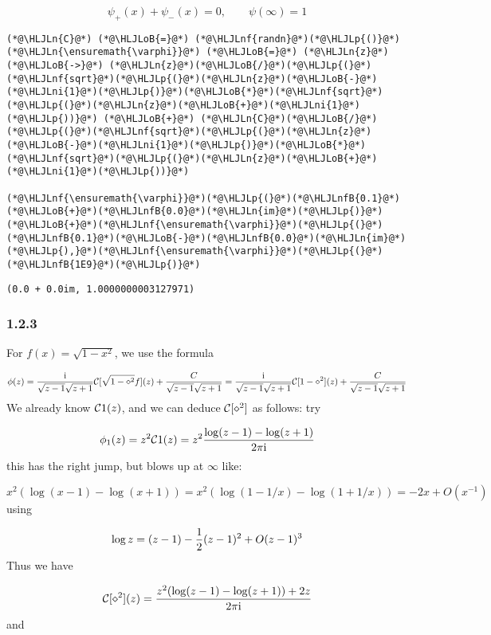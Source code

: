 \documentclass[12pt,a4paper]{article}
\newcommand{\HLJLn}[1]{#1}
\newcommand{\HLJLnf}[1]{\textcolor[RGB]{66,102,213}{#1}}
\newcommand{\HLJLnfB}[1]{\textcolor[RGB]{59,151,46}{#1}}
\newcommand{\HLJLni}[1]{\textcolor[RGB]{59,151,46}{#1}}
\newcommand{\HLJLoB}[1]{\textcolor[RGB]{102,102,102}{\textbf{#1}}}
\newcommand{\HLJLp}[1]{#1}
\def\I{ {\rm i} }
\def\CC{ {\cal C} }
\begin{document}
\[
\psi_+(x) + \psi_-(x) = 0, \qquad \psi(\infty) = 1
\]

\begin{lstlisting}
(*@\HLJLn{C}@*) (*@\HLJLoB{=}@*) (*@\HLJLnf{randn}@*)(*@\HLJLp{()}@*)
(*@\HLJLn{\ensuremath{\varphi}}@*) (*@\HLJLoB{=}@*) (*@\HLJLn{z}@*) (*@\HLJLoB{->}@*) (*@\HLJLn{z}@*)(*@\HLJLoB{/}@*)(*@\HLJLp{(}@*)(*@\HLJLnf{sqrt}@*)(*@\HLJLp{(}@*)(*@\HLJLn{z}@*)(*@\HLJLoB{-}@*)(*@\HLJLni{1}@*)(*@\HLJLp{)}@*)(*@\HLJLoB{*}@*)(*@\HLJLnf{sqrt}@*)(*@\HLJLp{(}@*)(*@\HLJLn{z}@*)(*@\HLJLoB{+}@*)(*@\HLJLni{1}@*)(*@\HLJLp{))}@*) (*@\HLJLoB{+}@*) (*@\HLJLn{C}@*)(*@\HLJLoB{/}@*)(*@\HLJLp{(}@*)(*@\HLJLnf{sqrt}@*)(*@\HLJLp{(}@*)(*@\HLJLn{z}@*)(*@\HLJLoB{-}@*)(*@\HLJLni{1}@*)(*@\HLJLp{)}@*)(*@\HLJLoB{*}@*)(*@\HLJLnf{sqrt}@*)(*@\HLJLp{(}@*)(*@\HLJLn{z}@*)(*@\HLJLoB{+}@*)(*@\HLJLni{1}@*)(*@\HLJLp{))}@*)

(*@\HLJLnf{\ensuremath{\varphi}}@*)(*@\HLJLp{(}@*)(*@\HLJLnfB{0.1}@*)(*@\HLJLoB{+}@*)(*@\HLJLnfB{0.0}@*)(*@\HLJLn{im}@*)(*@\HLJLp{)}@*)(*@\HLJLoB{+}@*)(*@\HLJLnf{\ensuremath{\varphi}}@*)(*@\HLJLp{(}@*)(*@\HLJLnfB{0.1}@*)(*@\HLJLoB{-}@*)(*@\HLJLnfB{0.0}@*)(*@\HLJLn{im}@*)(*@\HLJLp{),}@*)(*@\HLJLnf{\ensuremath{\varphi}}@*)(*@\HLJLp{(}@*)(*@\HLJLnfB{1E9}@*)(*@\HLJLp{)}@*)
\end{lstlisting}

\begin{lstlisting}
(0.0 + 0.0im, 1.0000000003127971)
\end{lstlisting}


\subsubsection{1.2.3}
For $f(x) = \sqrt{1-x^2}$, we use the formula

\[
\phi(z) = {\I \over \sqrt{z - 1} \sqrt{z+1}} \CC[\sqrt{1-\diamond^2} f](z) + {C \over \sqrt{z-1}\sqrt{z+1}}  = {\I \over \sqrt{z - 1} \sqrt{z+1}} \CC[1-\diamond^2](z) + {C \over \sqrt{z-1}\sqrt{z+1}}
\]
We already know $\CC1(z)$, and we can deduce $\CC[\diamond^2]$ as follows: try

\[
\phi_1(z) = z^2 \CC1(z) = z^2 {\log(z-1) - \log(z+1) \over 2 \pi \I}
\]
this has the right jump, but blows up at $\infty$ like:

\[
x^2 (\log(x-1) - \log(x+1)) = x^2 (\log(1-1/x)  - \log(1+1/x) )
= -2 x + O(x^{-1})
\]
using

\[
\log z = (z-1) - {1\over 2}(z-1)^2 + O(z-1)^3
\]
Thus we have

\[
\CC[\diamond^2](z) = {z^2 (\log(z-1) - \log(z+1)) + 2 z \over 2 \pi \I}
\]
and
\end{document}

